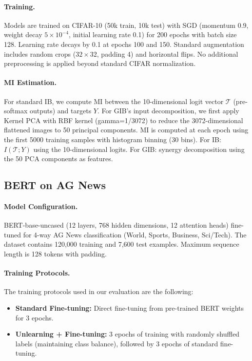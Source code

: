 \documentclass{article}
\theoremstyle{definition}
\theoremstyle{remark}
\begin{document}
\paragraph{Training.} Models are trained on CIFAR-10 (50k train, 10k test) with SGD (momentum 0.9, weight decay $5 \times 10^{-4}$, initial learning rate 0.1) for 200 epochs with batch size 128. Learning rate decays by 0.1 at epochs 100 and 150. Standard augmentation includes random crops ($32\times32$, padding 4) and horizontal flips. No additional preprocessing is applied beyond standard CIFAR normalization.

\paragraph{MI Estimation.} For standard IB, we compute MI between the 10-dimensional logit vector $\mathcal{T}$ (pre-softmax outputs) and targets $Y$. For GIB's input decomposition, we first apply Kernel PCA with RBF kernel (gamma=1/3072) to reduce the 3072-dimensional flattened images to 50 principal components. MI is computed at each epoch using the first 5000 training samples with histogram binning (30 bins). For IB: $I(\mathcal{T}; Y)$ using the 10-dimensional logits. For GIB: synergy decomposition using the 50 PCA components as features.

\subsection{BERT on AG News}
\label{app:transformers}

\paragraph{Model Configuration.} BERT-base-uncased (12 layers, 768 hidden dimensions, 12 attention heads) fine-tuned for 4-way AG News classification (World, Sports, Business, Sci/Tech). The dataset contains 120,000 training and 7,600 test examples. Maximum sequence length is 128 tokens with padding.

\paragraph{Training Protocols.} The training protocols used in our evaluation are the following:
\begin{itemize}
    \item \textbf{Standard Fine-tuning:} Direct fine-tuning from pre-trained BERT weights for 3 epochs.
    \item \textbf{Unlearning + Fine-tuning:} 3 epochs of training with randomly shuffled labels (maintaining class balance), followed by 3 epochs of standard fine-tuning.
\end{itemize}
\end{document}
